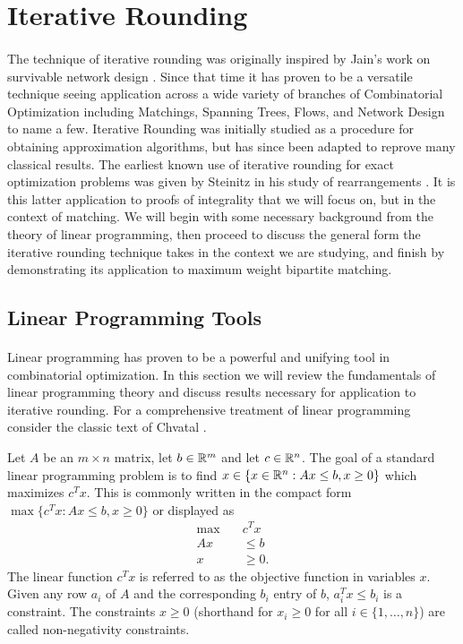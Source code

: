 \section{Iterative Rounding}\label{IR}
\paragraph{}
The technique of iterative rounding was originally inspired by Jain's work on survivable network design \cite{jain2001factor}. Since that time it has proven to be a versatile technique seeing application across a wide variety of branches of Combinatorial Optimization including Matchings, Spanning Trees, Flows, and Network Design \cite{lau2011iterative} to name a few. Iterative Rounding was initially studied as a procedure for obtaining approximation algorithms, but has since been adapted to reprove many classical results. The earliest known use of iterative rounding for exact optimization problems was given by Steinitz in his study of rearrangements \cite{steinitz1913bedingt}. It is this latter application to proofs of integrality that we will focus on, but in the context of matching. We will begin with some necessary background from the theory of linear programming, then proceed to discuss the general form the iterative rounding technique takes in the context we are studying, and finish by demonstrating its application to maximum weight bipartite matching.
\subsection{Linear Programming Tools}\label{IR:LP}
\paragraph{}
Linear programming has proven to be a powerful and unifying tool in combinatorial optimization. In this section we will review the fundamentals of linear programming theory and discuss results necessary for application to iterative rounding. For a comprehensive treatment of linear programming consider the classic text of Chvatal \cite{chvatal1983linear}.
\begin{definition}
Let $A$ be an $m \times n$ matrix, let $b \in \mathbb{R}^m$ and let $c \in \mathbb{R}^n$. The goal of a standard linear programming problem is to find $x \in \{x \in \mathbb{R}^n : Ax \leq b, x \geq 0 \}$ which maximizes $c^Tx$. This is commonly written in the compact form $\max\{c^Tx : Ax \leq b, x \geq 0 \}$ or displayed as
\begin{align*}
\max\quad &c^Tx \\
Ax &\leq b \\
x &\geq 0.
\end{align*}
The linear function $c^Tx$ is referred to as the objective function in variables $x$. Given any row $a_i$ of $A$ and the corresponding $b_i$ entry of $b$, $a_i^Tx \leq b_i$ is a constraint. The constraints $x \geq 0$ (shorthand for $x_i \geq 0$ for all $i \in \{1, \dots, n\}$) are called non-negativity constraints. 
\end{definition}
